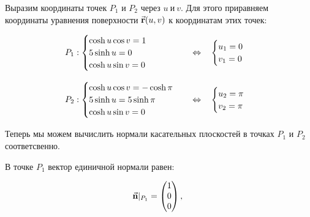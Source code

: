 \documentclass[12pt,a4paper]{article}
\begin{document}
    Выразим координаты точек $ P_1 $ и $ P_2 $ через $ u \ \text{и} \ v $. Для этого приравняем координаты уравнения поверхности $ \vec{\textbf r}(u, v) $ к координатам этих точек:

    \[
        \begin{tabular}{lcl}
            $
                P_1: 
                \begin{cases}
                    \cosh u \cos v = 1
                    \\
                    5 \sinh u = 0
                    \\
                    \cosh u \sin v = 0
                \end{cases} 
            $ 
            & $ \Leftrightarrow $ & 
            $
                \begin{cases}
                    u_1 = 0
                    \\
                    v_1 = 0
                \end{cases}
            $

            \\ \\

            $
                P_2: 
                \begin{cases}
                    \cosh u \cos v = -\cosh \pi
                    \\
                    5 \sinh u =  5 \sinh \pi
                    \\
                    \cosh u \sin v = 0
                \end{cases}
            $ 
            & $ \Leftrightarrow $ & 
            $
                \begin{cases}
                    u_2 = \pi
                    \\
                    v_2 = \pi
                \end{cases}
            $

        \end{tabular}
    \]

    Теперь мы можем вычислить нормали касательных плоскостей в точках $ P_1 $ и $ P_2 $ соответсвенно. 
    
    В точке $ {P_1} $ вектор единичной нормали равен:

    \[
        \vec{\textbf n}|_{P_1} =
        \begin{pmatrix}
            1 
            \\ 
            0 
            \\ 
            0  
        \end{pmatrix} \text{, }
    \]
\end{document}
